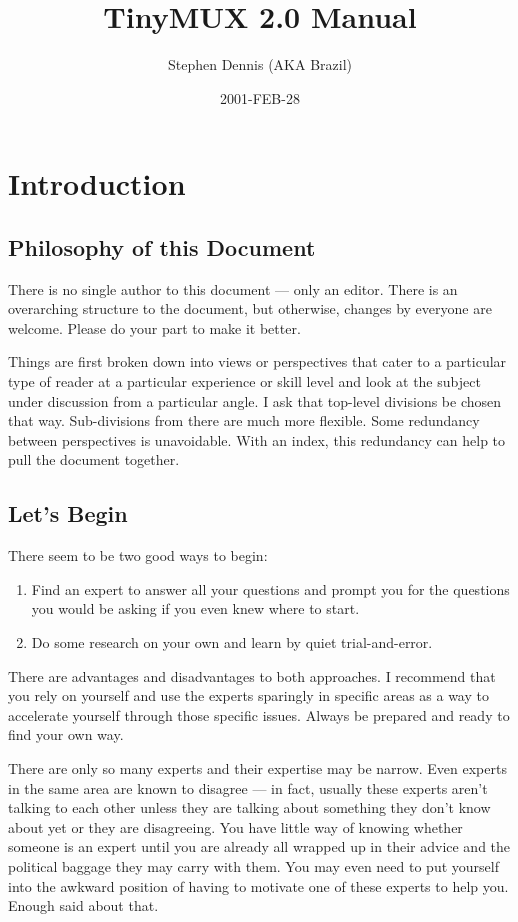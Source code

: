 \documentclass[letterpaper]{book}
\title{TinyMUX 2.0 Manual}
\author{Stephen Dennis (AKA Brazil)}
\date{2001-FEB-28}
\begin{document}
\maketitle
\chapter{Introduction}
\section{Philosophy of this Document}
There is no single author to this document --- only an editor. There is an
overarching structure to the document, but otherwise, changes by everyone are
welcome. Please do your part to make it better.

Things are first broken down into views or perspectives that cater to a
particular type of reader at a particular experience or skill level and look
at the subject under discussion from a particular angle. I ask that top-level
divisions be chosen that way. Sub-divisions from there are much more flexible.
Some redundancy between perspectives is unavoidable. With an index, this
redundancy can help to pull the document together.
\section{Let's Begin}
There seem to be two good ways to begin:
\begin{enumerate}
\item
Find an expert to answer all your questions and prompt you for the questions
you would be asking if you even knew where to start.
\item
Do some research on your own and learn by quiet trial-and-error.
\end{enumerate}
There are advantages and disadvantages to both approaches. I recommend that
you rely on yourself and use the experts sparingly in specific areas as a way
to accelerate yourself through those specific issues. Always be prepared and
ready to find your own way.

There are only so many experts and their expertise may be narrow. Even experts
in the same area are known to disagree --- in fact, usually these experts
aren't talking to each other unless they are talking about something they don't
know about yet or they are disagreeing. You have little way of knowing whether
someone is an expert until you are already all wrapped up in their advice and
the political baggage they may carry with them. You may even need to put
yourself into the awkward position of having to motivate one of these experts
to help you. Enough said about that.
\end{document}
